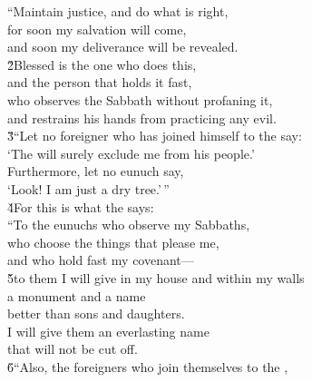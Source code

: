 \begin{poetry}
\poemll    ``Maintain justice, and do what is right, \\
\poeml for soon my salvation will come, \\
\poemll    and soon my deliverance will be revealed. \\
\poeml \v{2}Blessed is the one who does this, \\
\poemll    and the person that holds it fast, \\
\poeml who observes the Sabbath without profaning it, \\
\poemll    and restrains his hands from practicing any evil. \\
\poeml \v{3}``Let no foreigner who has joined himself to the  say: \\
\poemll    `The  will surely exclude me from his people.' \\
\poeml Furthermore, let no eunuch say, \\
\poemll    `Look! I am just a dry tree.'\,'' \\
\poeml \v{4}For this is what the  says: \\
\poeml ``To the eunuchs who observe my Sabbaths, \\
\poemll    who choose the things that please me, \\
\poemlll       and who hold fast my covenant--- \\
\poeml \v{5}to them I will give in my house and within my walls \\
\poemll    a monument and a name \\
\poemlll       better than sons and daughters. \\
\poeml I will give them an everlasting name \\
\poemll    that will not be cut off. \\
\poeml \v{6}``Also, the foreigners who join themselves to the , \\

\end{poetry}
